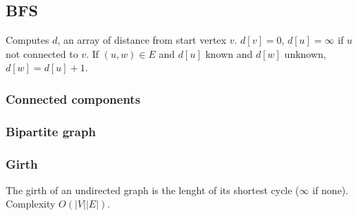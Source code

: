 \subsection{BFS}
Computes $d$, an array of distance from start vertex $v$.
$d[v]=0$, $d[u]=\infty$ if $u$ not connected to $v$. If $(u, w)\in E$ and $d[u]$ known and $d[w]$ unknown, $d[w] = d[u]+1$.\\

\subsubsection{Connected components}

\subsubsection{Bipartite graph}

\subsubsection{Girth}
The girth of an undirected graph is the lenght of its shortest cycle ($\infty$ if none). Complexity $O(|V| |E|)$. \\


